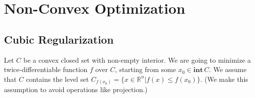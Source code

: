 \documentclass[openany]{book}
\theoremstyle{definition}
\theoremstyle{remark}
\begin{document}
\begin{comment}
\part{Stochastic and Online Convex Optimization}
\chapter{Stochastic Convex Optimization}
\section{Stochastic Variance Reduced Gradient}
From this section on, we will focus on the finite sum minimization problem. Let $f(x)=\frac{1}{m}\sum_{i=1}^{m}f_i(x)$. The stochastic variance reduced gradient algorithm (SVRG) looks like:
\begin{algorithm}
    \caption{SVRG algorithm}
    \label{SVRG}
    \begin{algorithmic}
        \STATE{Initialize $T$, $\eta$, and $\tilde{x}^{(0)}$.}
        \FOR{$s=1,2,\ldots$}
        \STATE{Let $x^{(0)}=\tilde{x}=\tilde{x}^{(s-1)}$.}
        \STATE{$\tilde{\mu}=\frac{1}{m}\sum_{i=1}^{m}\nabla f_i(\tilde{x})$.}
        \FOR{$t=1$ \TO $T$}
        \STATE{Randomly pick $i_t\in\{1,2,\ldots,m\}$.}
        \STATE{$x^{(t+1)}=x^{(t)}-\eta(\nabla f_i(x^{(t)})-\nabla f_i(\tilde{x})+\tilde{\mu})$.}
        \ENDFOR
        \STATE{Let $\tilde{x}^s=x^{(T)}$, or $x^{(t)}$ where $t$ is chosen randomly from $\{0,1,\ldots,T-1\}$.}
        \ENDFOR
    \end{algorithmic}
\end{algorithm}
\end{comment}

\part{Non-Convex Optimization}
\chapter{Cubic Regularization}
Let $C$ be a convex closed set with non-empty interior. We are going to minimize a twice-differentiable function $f$ over $C$, starting from some $x_0\in \mathbf{int}\,C$. We assume that $C$ contains the level set $C_{f(x_0)}=\{x\in \mathbb{R}^n|f(x)\le f(x_0)\}$. (We make this assumption to avoid operations like projection.)
\end{document}
